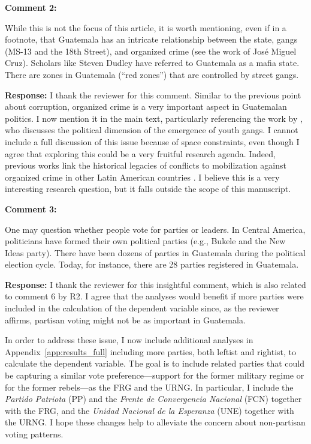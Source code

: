 \documentclass[12pt, a4paper, notitlepage]{article}
\begin{document}
\vspace{15pt}
\noindent\textbf{Comment 2:}
\begin{displayquote}
While this is not the focus of this article, it is worth mentioning, even if in a footnote, that Guatemala has an intricate relationship between the state, gangs (MS-13 and the 18th Street), and organized crime (see the work of José Miguel Cruz). Scholars like Steven Dudley have referred to Guatemala as a mafia state. There are zones in Guatemala (“red zones”) that are controlled by street gangs.
\end{displayquote}

\noindent\textbf{Response:} I thank the reviewer for this comment. Similar to the previous point about corruption, organized crime is a very important aspect in Guatemalan politics. I now mention it in the main text, particularly referencing the work by \citet{Levenson:2013tm}, who discusses the political dimension of the emergence of youth gangs. I cannot include a full discussion of this issue because of space constraints, even though I agree that exploring this could be a very fruitful research agenda. Indeed, previous works link the historical legacies of conflicts to mobilization against organized crime in other Latin American countries \citep{Osorio:2021aa}. I believe this is a very interesting research question, but it falls outside the scope of this manuscript.

\vspace{15pt}
\noindent\textbf{Comment 3:}
\begin{displayquote}
One may question whether people vote for parties or leaders. In Central America, politicians have formed their own political parties (e.g., Bukele and the New Ideas party). There have been dozens of parties in Guatemala during the political election cycle. Today, for instance, there are 28 parties registered in Guatemala.
\end{displayquote}

\noindent\textbf{Response:} I thank the reviewer for this insightful comment, which is also related to comment 6 by R2. I agree that the analyses would benefit if more parties were included in the calculation of the dependent variable since, as the reviewer affirms, partisan voting might not be as important in Guatemala.

In order to address these issue, I now include additional analyses in Appendix~\ref{app:results_full} including more parties, both leftist and rightist, to calculate the dependent variable.
The goal is to include related parties that could be capturing a similar vote preference---support for the former military regime or for the former rebels---as the FRG and the URNG.
In particular, I include the \textit{Partido Patriota} (PP) and the \textit{Frente de Convergencia Nacional} (FCN) together with the FRG, and the \textit{Unidad Nacional de la Esperanza} (UNE) together with the URNG.
I hope these changes help to alleviate the concern about non-partisan voting patterns.
\end{document}
